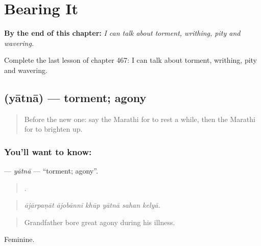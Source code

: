 
\chapter{Bearing It}
\label{ch:mr-bearing-it}

\begin{chapteropening}
\textbf{By the end of this chapter:} \emph{I can talk about torment, writhing, pity and wavering.}

Complete the last lesson of chapter 467: I can talk about torment, writhing, pity and wavering.
\end{chapteropening}

\section[\texorpdfstring{\mr{यातना} (yātnā)}{यातना (yātnā)}]{ (yātnā) — torment; agony}

\label{lesson:MR-C467-yatna}



\begin{quote}
Before the new one: say the Marathi for to rest a while, then the Marathi for to brighten up.
\end{quote}

\subsection*{You'll want to know: }
\textbf{} — \emph{yātnā} — \textquotedblleft{}torment; agony\textquotedblright{}.

\begin{quote}
     .
\end{quote}

\begin{quote}
\emph{ājārpaṇāt ājobānnī khūp yātnā sahan kelyā.}
\end{quote}

\begin{quote}
Grandfather bore great agony during his illness.
\end{quote}

Feminine.

